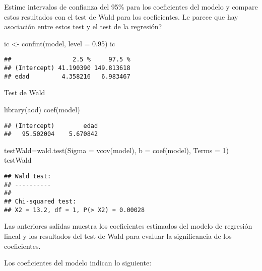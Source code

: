 \documentclass[
]{article}
\newenvironment{Shaded}{\begin{snugshade}}{\end{snugshade}}
\newcommand{\AttributeTok}[1]{\textcolor[rgb]{0.77,0.63,0.00}{#1}}
\newcommand{\DecValTok}[1]{\textcolor[rgb]{0.00,0.00,0.81}{#1}}
\newcommand{\FloatTok}[1]{\textcolor[rgb]{0.00,0.00,0.81}{#1}}
\newcommand{\FunctionTok}[1]{\textcolor[rgb]{0.00,0.00,0.00}{#1}}
\newcommand{\NormalTok}[1]{#1}
\newcommand{\OtherTok}[1]{\textcolor[rgb]{0.56,0.35,0.01}{#1}}
\begin{document}
Estime intervalos de confianza del 95\% para los coeficientes del modelo
y compare estos resultados con el test de Wald para los coeficientes. Le
parece que hay asociación entre estos test y el test de la regresión?

\begin{Shaded}
\begin{Highlighting}[]
\NormalTok{ic }\OtherTok{\textless{}{-}} \FunctionTok{confint}\NormalTok{(model, }\AttributeTok{level =} \FloatTok{0.95}\NormalTok{)}
\NormalTok{ic}
\end{Highlighting}
\end{Shaded}

\begin{verbatim}
##                 2.5 %     97.5 %
## (Intercept) 41.190390 149.813618
## edad         4.358216   6.983467
\end{verbatim}

Test de Wald

\begin{Shaded}
\begin{Highlighting}[]
\FunctionTok{library}\NormalTok{(aod)}
\FunctionTok{coef}\NormalTok{(model)}
\end{Highlighting}
\end{Shaded}

\begin{verbatim}
## (Intercept)        edad 
##   95.502004    5.670842
\end{verbatim}

\begin{Shaded}
\begin{Highlighting}[]
\NormalTok{testWald}\OtherTok{=}\FunctionTok{wald.test}\NormalTok{(}\AttributeTok{Sigma =} \FunctionTok{vcov}\NormalTok{(model), }\AttributeTok{b =} \FunctionTok{coef}\NormalTok{(model), }\AttributeTok{Terms =} \DecValTok{1}\NormalTok{)}
\NormalTok{testWald}
\end{Highlighting}
\end{Shaded}

\begin{verbatim}
## Wald test:
## ----------
## 
## Chi-squared test:
## X2 = 13.2, df = 1, P(> X2) = 0.00028
\end{verbatim}

Las anteriores salidas muestra los coeficientes estimados del modelo de
regresión lineal y los resultados del test de Wald para evaluar la
significancia de los coeficientes.

Los coeficientes del modelo indican lo siguiente:
\end{document}
